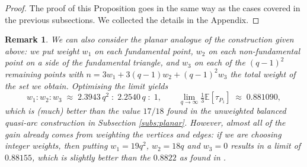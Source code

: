 \documentclass{article}
\newtheorem{theorem}{Theorem}
\newtheorem{remark}{Remark}
\newcommand{\E}{\mathbb{E}}
\begin{document}
\begin{proof} The proof of this Proposition goes in the same way as the cases covered in the previous subsections. We collected the details in the Appendix.
\end{proof}
\begin{remark}\label{rem:k3}
We can also consider the planar analogue of the construction given above: we put weight $w_1$ on each fundamental point, $w_2$ on each non-fundamental
point on a side of the fundamental triangle, and $w_3$ on each of the $(q-1)^2$ remaining points 
with $n=3w_1+3(q-1)w_2+(q-1)^2 w_3$ the total weight of the set we obtain. Optimising the limit yields
\[
  w_1:w_2:w_3 \;\approx\; 2.3943\,q^2 \;:\; 2.2540\,q \;:\; 1,
  \qquad
  \lim_{q\to\infty}\tfrac{1}{3}\E[\tau_{P_1}]\;\approx\;0.881090,
\]
which is (much) better than the value $17/18$ found in the unweighted balanced quasi-arc construction in Subsection \ref{subs:planar}. However, almost all of the gain
already comes from weighting the vertices and edges: if we are choosing integer weights, then putting $w_1=19q^2$, $w_2=18q$ and $w_3=0$ results in a limit of $0.88155$, which is slightly better than the $0.8822$ as found in \cite{GruicaMontanucciZullo2026}.
\end{remark}



\end{document}
